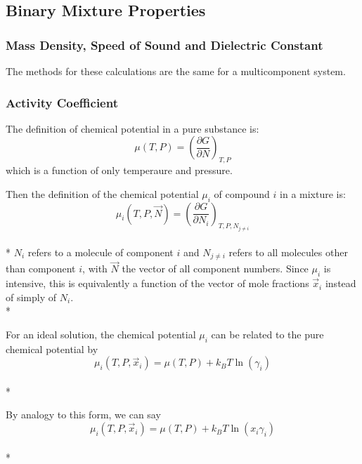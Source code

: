 \documentclass[aps,pre,twocolumn,nofootinbib,superscriptaddress,linenumbers,10pt, draft,tightenlines]{revtex4-1}
\begin{document}

\subsection{Binary Mixture Properties} 
\subsubsection{Mass Density, Speed of Sound and Dielectric Constant}
The methods for these calculations are the same for a multicomponent system.


\subsubsection{Activity Coefficient}
The definition of chemical potential in a pure substance is:
\begin{equation}\mu(T,P) = \left(\frac{\partial G}{\partial N}\right)_{T,P}\end{equation}
which is a function of only temperaure and pressure.

Then the definition of the chemical potential $\mu_i$ of compound $i$ in a mixture is:
\begin{equation}\mu_{i}(T,P,\vec{N}) = \left(\frac{\partial G}{\partial N_{i}}\right)_{T,P,N_{j \neq i}}\end{equation}\\*
$N_i$ refers to a molecule of component $i$ and $N_{j \neq i}$ refers
to all molecules other than component $i$, with $\vec{N}$ the vector
of all component numbers. Since $\mu_i$ is intensive, this is
equivalently a function of the vector of mole fractions $\vec{x}_i$ instead of simply of $N_i$.\\*

For an ideal solution, the chemical potential $\mu_i$ can be related to the pure chemical potential by 
\begin{equation}\mu_{i}(T,P,\vec{x}_i) = \mu(T,P) + k_B T \ln\left(\gamma_i\right)\end{equation}\\*

By analogy to this form, we can say 
\begin{equation}\mu_{i}(T,P,\vec{x}_i) = \mu(T,P) + k_B T \ln\left(x_i \gamma_i\right)\end{equation}\\*
\end{document}
